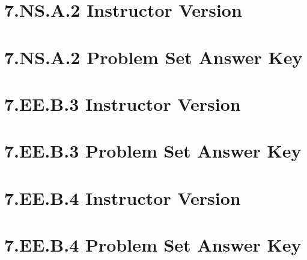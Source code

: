 \documentclass[a4paper,12pt]{article}
\begin{document}
\newpage
\section{7.NS.A.2 Instructor Version}


\newpage
\section{7.NS.A.2 Problem Set Answer Key}


\newpage
\section{7.EE.B.3 Instructor Version}


\newpage
\section{7.EE.B.3 Problem Set Answer Key}


\newpage
\section{7.EE.B.4 Instructor Version}


\newpage
\section{7.EE.B.4 Problem Set Answer Key}

\end{document}
